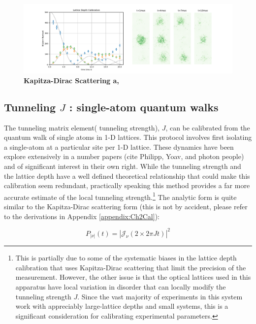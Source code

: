 \begin{figure}[ht!]
		\includegraphics[width=\columnwidth]{figures/ch2/kapitza_dirac_latt_depth/KDCal.pdf} 
		\caption{\textbf{Kapitza-Dirac Scattering a,}   }
		\label{fig:KDScatt}	
\end{figure}

\subsection{Tunneling $J$ : single-atom quantum walks}

The tunneling matrix element( tunneling strength), $J$, can be calibrated from the quantum walk of single atoms in 1-D lattices. This protocol involves first isolating a single-atom at a particular site per 1-D lattice. These dynamics have been explore extensively in a number papers (cite Philipp, Yoav, and photon people) and of significant interest in their own right. While the tunneling strength and the lattice depth have a well defined theoretical relationship that could make this calibration seem redundant, practically speaking this method provides a far more accurate estimate of the local tunneling strength.\footnote{This is partially due to some of the systematic biases in the lattice depth calibration that uses Kapitza-Dirac scattering that limit the precision of the measurement. However, the other issue is that the optical lattices used in this apparatus have local variation in disorder that can locally modify the tunneling strength $J$. Since the vast majority of experiments in this system work with appreciably large-lattice depths and small systems, this is a significant consideration for calibrating experimental parameters.}  The analytic form is quite similar to the Kapitza-Dirac scattering form (this is not by accident, please refer to the derivations in Appendix \ref{appendix:Ch2Cal}):

\begin{equation}
\label{eqn:QWanalytic}
P_{|\nu|}(t)= \left | \mathcal{J}_\nu \left ( {2 \times  2 \pi J t} \right ) \right |^2
\end{equation}

